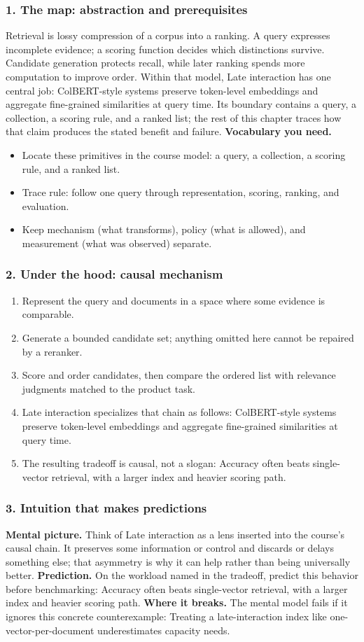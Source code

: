\subsubsection*{1. The map: abstraction and prerequisites}
Retrieval is lossy compression of a corpus into a ranking. A query expresses incomplete evidence; a scoring function decides which distinctions survive. Candidate generation protects recall, while later ranking spends more computation to improve order.
Within that model, Late interaction has one central job: ColBERT-style systems preserve token-level embeddings and aggregate fine-grained similarities at query time. Its boundary contains a query, a collection, a scoring rule, and a ranked list; the rest of this chapter traces how that claim produces the stated benefit and failure.
\textbf{Vocabulary you need.}\begin{itemize}
\item Locate these primitives in the course model: a query, a collection, a scoring rule, and a ranked list.
\item Trace rule: follow one query through representation, scoring, ranking, and evaluation.
\item Keep mechanism (what transforms), policy (what is allowed), and measurement (what was observed) separate.
\end{itemize}
\subsubsection*{2. Under the hood: causal mechanism}\begin{enumerate}
\item Represent the query and documents in a space where some evidence is comparable.
\item Generate a bounded candidate set; anything omitted here cannot be repaired by a reranker.
\item Score and order candidates, then compare the ordered list with relevance judgments matched to the product task.
\item Late interaction specializes that chain as follows: ColBERT-style systems preserve token-level embeddings and aggregate fine-grained similarities at query time.
\item The resulting tradeoff is causal, not a slogan: Accuracy often beats single-vector retrieval, with a larger index and heavier scoring path.
\end{enumerate}
\subsubsection*{3. Intuition that makes predictions}
\textbf{Mental picture.} Think of Late interaction as a lens inserted into the course's causal chain. It preserves some information or control and discards or delays something else; that asymmetry is why it can help rather than being universally better.
\textbf{Prediction.} On the workload named in the tradeoff, predict this behavior before benchmarking: Accuracy often beats single-vector retrieval, with a larger index and heavier scoring path.
\textbf{Where it breaks.} The mental model fails if it ignores this concrete counterexample: Treating a late-interaction index like one-vector-per-document underestimates capacity needs.
